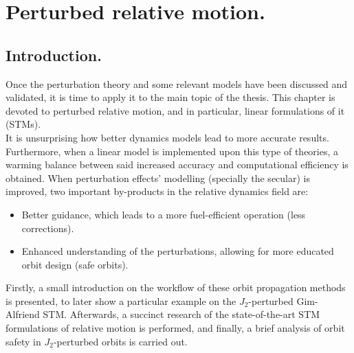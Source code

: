 \chapter{Perturbed relative motion.}
%
\label{chap:Chap_5}
%
\section{Introduction.}
%
\indent Once the perturbation theory and some relevant models have been discussed and validated, it is time to apply it to the main topic of the thesis. This chapter is devoted to perturbed relative motion, and in particular, linear formulations of it (\ie STMs). \\
%
\indent It is unsurprising how better dynamics models lead to more accurate results. Furthermore, when a linear model is implemented upon this type of theories, a warming balance between said increased accuracy and computational efficiency is obtained. When perturbation effects' modelling (specially the secular) is improved, two important by-products in the relative dynamics field are:
%
\begin{itemize}
\item[\GMVred{I.}] Better guidance, which leads to a more fuel-efficient operation (less corrections).
%
\item[\GMVred{II.}] Enhanced understanding of the perturbations, allowing for more educated orbit design (\eg safe orbits).
\end{itemize}
%
\indent Firstly, a small introduction on the workflow of these orbit propagation methods is presented, to later show a particular example on the $J_2$-perturbed Gim-Alfriend STM. Afterwards, a succinct research of the state-of-the-art STM formulations of relative motion is performed, and finally, a brief analysis of orbit safety in $J_2$-perturbed orbits is carried out. \\
%
